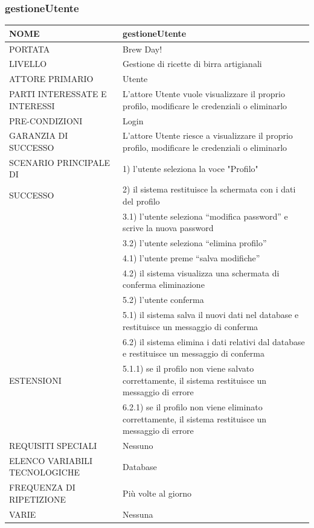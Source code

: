 \documentclass[a4paper, titlepage]{article}
\begin{document}
\subsubsection{gestioneUtente}
\begin{longtable}{p{6cm}p{7cm}}\toprule
    NOME & gestioneUtente\\\midrule
    PORTATA & Brew Day!\\\midrule
    LIVELLO & Gestione di ricette di birra artigianali\\\midrule
    ATTORE PRIMARIO & Utente\\\midrule
    PARTI INTERESSATE E INTERESSI & L’attore Utente vuole visualizzare il proprio profilo, modificare le credenziali o eliminarlo\\\midrule
    PRE-CONDIZIONI & Login\\\midrule
    GARANZIA DI SUCCESSO & L’attore Utente riesce a visualizzare il proprio profilo, modificare le credenziali o eliminarlo\\\midrule
    SCENARIO PRINCIPALE DI
    & 1) l’utente seleziona la voce "Profilo"\\
    SUCCESSO & 2) il sistema restituisce la schermata con i dati del profilo\\
    & 3.1) l’utente seleziona “modifica password” e scrive la nuova password\\
    & 3.2) l’utente seleziona “elimina profilo”\\
    & 4.1) l'utente preme “salva modifiche”\\
    & 4.2) il sistema visualizza una schermata di conferma eliminazione\\
    & 5.2) l’utente conferma\\
    & 5.1) il sistema salva il nuovi dati nel database e restituisce un messaggio di conferma\\
    & 6.2) il sistema elimina i dati relativi dal database e restituisce un messaggio di conferma\\\midrule
    ESTENSIONI
    & 5.1.1) se il profilo non viene salvato correttamente, il sistema restituisce un messaggio di errore\\
    & 6.2.1) se il profilo non viene eliminato correttamente, il sistema restituisce un messaggio di errore\\\midrule
    REQUISITI SPECIALI & Nessuno\\\midrule
    ELENCO VARIABILI TECNOLOGICHE & Database\\\midrule
    FREQUENZA DI RIPETIZIONE & Più volte al giorno\\\midrule
    VARIE & Nessuna\\\bottomrule
\end{longtable}
\vphantom{}
\newpage
\end{document}
